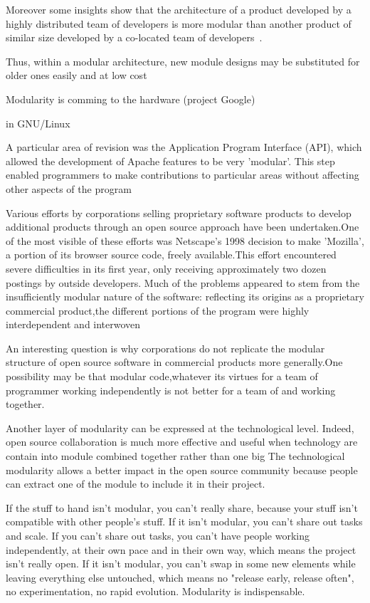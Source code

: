 Moreover some insights show that the architecture of a product developed by a highly distributed team of developers is more modular than another product of similar size developed by a co-located team of developers~\cite{maccormack2006exploring}.




Thus, within a modular architecture, new module designs may be substituted for older ones easily and at low cost



Modularity is comming to the hardware (project Google)

\cite{narduzzo2008modularity} in GNU/Linux

\cite{lerner2002some}
A particular area of revision was the Application Program Interface (API), which allowed the development of Apache features to be very 'modular'. This step enabled programmers to make contributions to particular areas without affecting other aspects of the program

Various efforts by corporations selling proprietary software products to develop additional products through an open source approach have been undertaken.One of the most visible of these efforts was Netscape's 1998 decision to make 'Mozilla', a portion of its browser source code, freely available.This effort encountered severe difficulties in its first year, only receiving approximately two dozen postings by outside developers. Much of the problems appeared to stem from the insufficiently modular nature of the software: reflecting its origins as a proprietary commercial product,the different portions of the program were highly interdependent and interwoven

An interesting question is why corporations do not replicate the modular structure of open source software in commercial products more generally.One possibility may be that modular code,whatever its  virtues for a team of programmer working independently is not better for a team of and working together.




Another layer of modularity can be expressed at the technological level. Indeed, open source collaboration is much more effective and useful when technology are contain into module combined together rather than one big
The technological modularity allows a better impact in the open source community because people can extract one of the module to include it in their project.

If the stuff to hand isn't modular, you can't really share, because your stuff isn't compatible with other people's stuff. If it isn't modular, you can't share out tasks and scale. If you can't share out tasks, you can't have people working independently, at their own pace and in their own way, which means the project isn't really open. If it isn't modular, you can't swap in some new elements while leaving everything else untouched, which means no "release early, release often", no experimentation, no rapid evolution. Modularity is indispensable.


